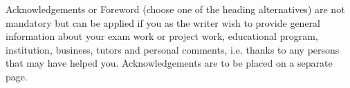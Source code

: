 Acknowledgements or Foreword (choose one of the heading
alternatives) are not mandatory but can be applied if you as the writer
wish to provide general information about your exam work or project
work, educational program, institution, business, tutors and personal
comments, i.e. thanks to any persons that may have helped you.
Acknowledgements are to be placed on a separate page. 